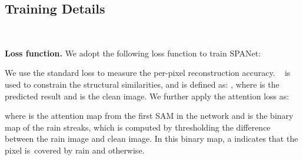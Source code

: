 \documentclass[10pt,twocolumn,letterpaper]{article}
\begin{document}
\subsection{Training Details}~\label{sec:train}

{\bf Loss function.} We adopt the following loss function to train SPANet:

We use the standard  loss to measure the per-pixel reconstruction accuracy. ~\cite{wang:tip:2004:ssim} is used to constrain the structural similarities, and is defined as: ,
where  is the predicted result and  is the clean image. 
We further apply the attention loss  as:

where  is the attention map from the first SAM in the network and  is the binary map of the rain streaks, which is computed by thresholding the difference between the rain image and clean image. In this binary map, a  indicates that the pixel is~covered by rain and  otherwise.
\end{document}
